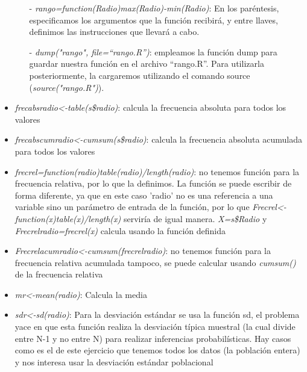 \documentclass[a4paper, 12pt]{article}
\begin{document}
\begin{itemize}
\begin{itemize}
                \item[-] \emph{rango=function(Radio){max(Radio)-min(Radio)}}: En los paréntesis, especificamos los argumentos que la función recibirá, y entre llaves, definimos las instrucciones que llevará a cabo.
                
                \item[-] \emph{dump("rango", file=\textquotedblleft rango.R\textquotedblright)}: empleamos la función dump para guardar nuestra función en el archivo \textquotedblleft rango.R\textquotedblright. Para utilizarla posteriormente, la cargaremos utilizando el comando source (\emph{source("rango.R")}).
                \
            \end{itemize} 
        
            \item \emph{frecabsradio<-table(s\$radio)}: calcula la frecuencia absoluta para todos los valores
        
            \item \emph{frecabscumradio<-cumsum(s\$radio)}: calcula la frecuencia absoluta acumulada para todos los valores
        
            \item \emph{frecrel=function(radio){table(radio)/length(radio)}}: no tenemos función para la frecuencia relativa, por lo que la definimos. La función se puede escribir de forma diferente, ya que en este caso 'radio' no es una referencia a una variable sino un parámetro de entrada de la función, por lo que \emph{Frecrel<-function(x){table(x)/length(x)}} serviría de igual manera. \emph{X=s\$Radio} y \emph{Frecrelradio=frecrel(x)} calcula usando la función definida
        
            \item \emph{Frecrelacumradio<-cumsum(frecrelradio)}: no tenemos función para la frecuencia relativa acumulada tampoco, se puede calcular usando \emph{cumsum()} de la frecuencia relativa
            
            \item \emph{mr<-mean(radio)}: Calcula la media
            
            \item \emph{sdr<-sd(radio)}: Para la desviación estándar se usa la función sd, el problema yace en que esta función realiza la desviación típica muestral (la cual divide entre N-1 y no entre N) para realizar inferencias probabilísticas. Hay casos como es el de este ejercicio que tenemos todos los datos (la población entera) y nos interesa usar la desviación estándar poblacional
            

\end{itemize}
\end{document}
